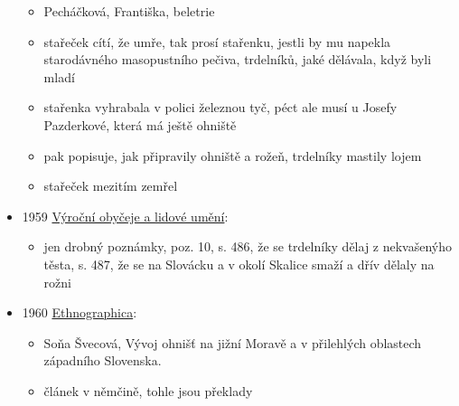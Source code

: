 \begin{itemize}
  \begin{itemize}
  \tightlist
  \item
    Pecháčková, Františka, beletrie
  \item
    stařeček cítí, že umře, tak prosí stařenku, jestli by mu napekla
    starodávného masopustního pečiva, trdelníků, jaké dělávala, když
    byli mladí
  \item
    stařenka vyhrabala v polici železnou tyč, péct ale musí u Josefy
    Pazderkové, která má ještě ohniště
  \item
    pak popisuje, jak připravily ohniště a rožeň, trdelníky mastily
    lojem
  \item
    stařeček mezitím zemřel
  \end{itemize}
\item
  1959
  \href{https://ceskadigitalniknihovna.cz/uuid/uuid:d7bb5685-7a29-11ed-b508-001b63bd97ba}{Výroční
  obyčeje a lidové umění}:

  \begin{itemize}
  \tightlist
  \item
    jen drobný poznámky, poz. 10, s. 486, že se trdelníky dělaj z
    nekvašenýho těsta, s. 487, že se na Slovácku a v okolí Skalice smaží
    a dřív dělaly na rožni
  \end{itemize}
\item
  1960
  \href{https://ceskadigitalniknihovna.cz/view/uuid:747980d0-a9c9-11e7-920d-005056827e51?page=uuid\%3A6d279530-a5e3-11e8-8b41-005056822549&fulltext=trdlovec&source=nkp}{Ethnographica}:

  \begin{itemize}
  \tightlist
  \item
    Soňa Švecová, Vývoj ohnišť na jižní Moravě a v přilehlých oblastech
    západního Slovenska.
  \item
    článek v němčině, tohle jsou překlady


\end{itemize}
\end{itemize}
